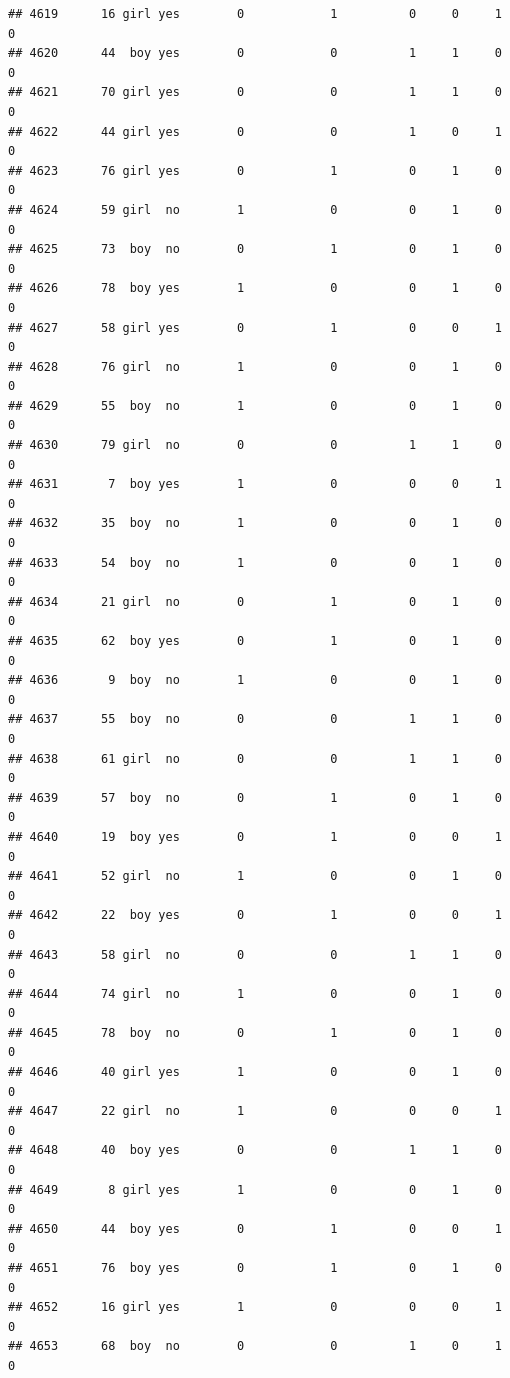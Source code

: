 \documentclass[man]{apa6}
\begin{document}
\begin{verbatim}
## 4619      16 girl yes        0            1          0     0     1     0
## 4620      44  boy yes        0            0          1     1     0     0
## 4621      70 girl yes        0            0          1     1     0     0
## 4622      44 girl yes        0            0          1     0     1     0
## 4623      76 girl yes        0            1          0     1     0     0
## 4624      59 girl  no        1            0          0     1     0     0
## 4625      73  boy  no        0            1          0     1     0     0
## 4626      78  boy yes        1            0          0     1     0     0
## 4627      58 girl yes        0            1          0     0     1     0
## 4628      76 girl  no        1            0          0     1     0     0
## 4629      55  boy  no        1            0          0     1     0     0
## 4630      79 girl  no        0            0          1     1     0     0
## 4631       7  boy yes        1            0          0     0     1     0
## 4632      35  boy  no        1            0          0     1     0     0
## 4633      54  boy  no        1            0          0     1     0     0
## 4634      21 girl  no        0            1          0     1     0     0
## 4635      62  boy yes        0            1          0     1     0     0
## 4636       9  boy  no        1            0          0     1     0     0
## 4637      55  boy  no        0            0          1     1     0     0
## 4638      61 girl  no        0            0          1     1     0     0
## 4639      57  boy  no        0            1          0     1     0     0
## 4640      19  boy yes        0            1          0     0     1     0
## 4641      52 girl  no        1            0          0     1     0     0
## 4642      22  boy yes        0            1          0     0     1     0
## 4643      58 girl  no        0            0          1     1     0     0
## 4644      74 girl  no        1            0          0     1     0     0
## 4645      78  boy  no        0            1          0     1     0     0
## 4646      40 girl yes        1            0          0     1     0     0
## 4647      22 girl  no        1            0          0     0     1     0
## 4648      40  boy yes        0            0          1     1     0     0
## 4649       8 girl yes        1            0          0     1     0     0
## 4650      44  boy yes        0            1          0     0     1     0
## 4651      76  boy yes        0            1          0     1     0     0
## 4652      16 girl yes        1            0          0     0     1     0
## 4653      68  boy  no        0            0          1     0     1     0

\end{verbatim}
\end{document}

